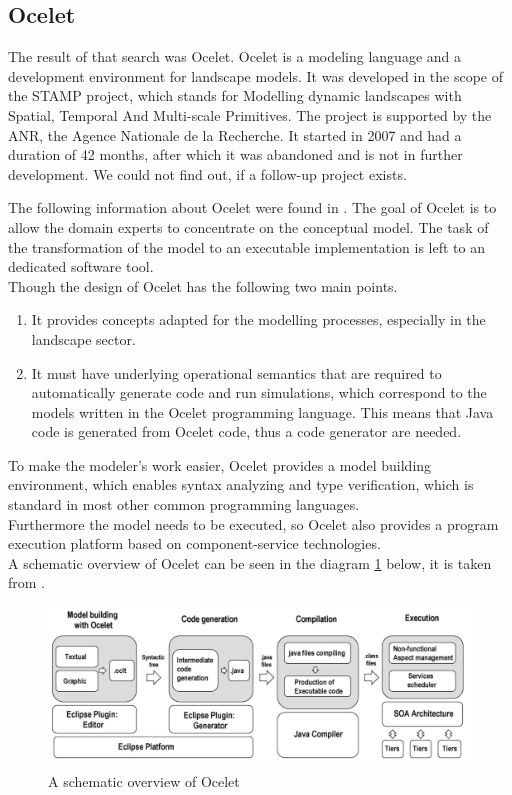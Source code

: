 \subsection{Ocelet}
\par
The result of that search was Ocelet. Ocelet is a modeling language and a development environment for landscape models. It was developed in the scope of the STAMP project, which stands for Modelling dynamic landscapes with Spatial, Temporal And Multi-scale Primitives. \autocite{dsl:ocelet-wiki} The project is supported by the ANR, the Agence Nationale de la Recherche. It started in 2007 and had a duration of 42 months, after which it was abandoned and is not in further development. We could not find out, if a follow-up project exists.
\par
The following information about Ocelet were found in \autocite{dsl:ocelet-design}. The goal of Ocelet is to allow the domain experts to concentrate on the conceptual model. The task of the transformation of the model to an executable implementation is left to an dedicated software tool.  \\
Though the design of Ocelet has the following two main points.
\begin{enumerate}
	\item It provides concepts adapted for the modelling processes, especially in the landscape sector.
	\item It must have underlying operational semantics that are required to automatically generate code and run simulations, which correspond to the models written in the Ocelet programming language. This means that Java code is generated from Ocelet code, thus a code generator are needed.
\end{enumerate}
To make the modeler’s work easier, Ocelet provides a model building environment, which enables syntax analyzing and type verification, which is standard in most other common programming languages. \\
Furthermore the model needs to be executed, so Ocelet also provides a program execution platform based on component-service technologies. \\
A schematic overview of Ocelet can be seen in the diagram \ref{fig:ocelet_modelling_and_simulation_framework} below, it is taken from \autocite{dsl:ocelet-design}.
\begin{figure}[h]
	\centering
	\includegraphics[width=1.0\textwidth]{pics/ocelet/ocelet_modelling_and_simulation_framework.png}
	\caption{A schematic overview of Ocelet \label{fig:ocelet_modelling_and_simulation_framework}}	
\end{figure}

